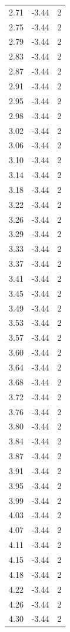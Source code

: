 \begin{longtable}{lrr}
  2.71 & -3.44 & 2 \\
  2.75 & -3.44 & 2 \\
  2.79 & -3.44 & 2 \\
  2.83 & -3.44 & 2 \\
  2.87 & -3.44 & 2 \\
  2.91 & -3.44 & 2 \\
  2.95 & -3.44 & 2 \\
  2.98 & -3.44 & 2 \\
  3.02 & -3.44 & 2 \\
  3.06 & -3.44 & 2 \\
  3.10 & -3.44 & 2 \\
  3.14 & -3.44 & 2 \\
  3.18 & -3.44 & 2 \\
  3.22 & -3.44 & 2 \\
  3.26 & -3.44 & 2 \\
  3.29 & -3.44 & 2 \\
  3.33 & -3.44 & 2 \\
  3.37 & -3.44 & 2 \\
  3.41 & -3.44 & 2 \\
  3.45 & -3.44 & 2 \\
  3.49 & -3.44 & 2 \\
  3.53 & -3.44 & 2 \\
  3.57 & -3.44 & 2 \\
  3.60 & -3.44 & 2 \\
  3.64 & -3.44 & 2 \\
  3.68 & -3.44 & 2 \\
  3.72 & -3.44 & 2 \\
  3.76 & -3.44 & 2 \\
  3.80 & -3.44 & 2 \\
  3.84 & -3.44 & 2 \\
  3.87 & -3.44 & 2 \\
  3.91 & -3.44 & 2 \\
  3.95 & -3.44 & 2 \\
  3.99 & -3.44 & 2 \\
  4.03 & -3.44 & 2 \\
  4.07 & -3.44 & 2 \\
  4.11 & -3.44 & 2 \\
  4.15 & -3.44 & 2 \\
  4.18 & -3.44 & 2 \\
  4.22 & -3.44 & 2 \\
  4.26 & -3.44 & 2 \\
  4.30 & -3.44 & 2 \\

\end{longtable}
